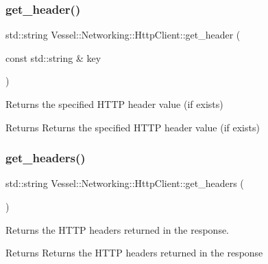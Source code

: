 \subsubsection{\texorpdfstring{get\+\_\+header()}{get\_header()}}
{\footnotesize\ttfamily std\+::string Vessel\+::\+Networking\+::\+Http\+Client\+::get\+\_\+header (\begin{DoxyParamCaption}\item[{const std\+::string \&}]{key }\end{DoxyParamCaption})}



Returns the specified H\+T\+TP header value (if exists) 

\begin{DoxyReturn}{Returns}
Returns the specified H\+T\+TP header value (if exists) 
\end{DoxyReturn}
\mbox{\label{class_vessel_1_1_networking_1_1_http_client_ad5ffe2d677a1ea783a66d3ea8d57d948}} 
\subsubsection{\texorpdfstring{get\+\_\+headers()}{get\_headers()}}
{\footnotesize\ttfamily std\+::string Vessel\+::\+Networking\+::\+Http\+Client\+::get\+\_\+headers (\begin{DoxyParamCaption}{ }\end{DoxyParamCaption})}



Returns the H\+T\+TP headers returned in the response. 

\begin{DoxyReturn}{Returns}
Returns the H\+T\+TP headers returned in the response 
\end{DoxyReturn}
\mbox{\label{class_vessel_1_1_networking_1_1_http_client_a71876628efd404463072ea3741c5cd03}} 
